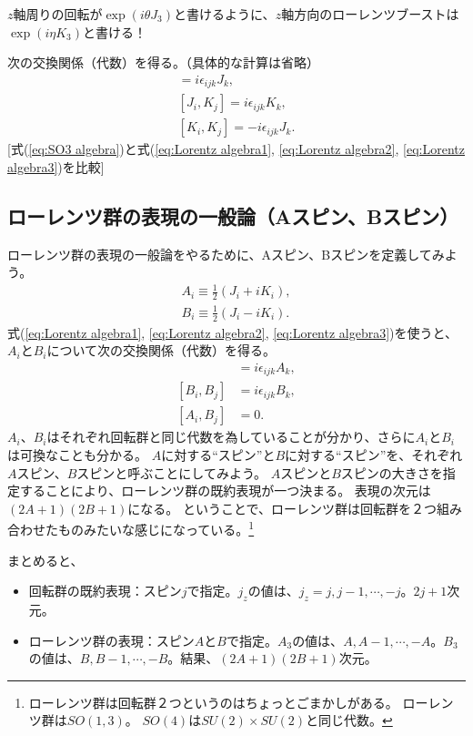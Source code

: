 \documentclass[10pt,a4paper]{jarticle}
\begin{document}
$z$軸周りの回転が$\exp(i \theta J_3 )$と書けるように、$z$軸方向のローレンツブーストは$\exp(i\eta K_3)$と書ける！

次の交換関係（代数）を得る。（具体的な計算は省略）
\begin{align}
[J_i, J_j] = i\epsilon_{ijk} J_k, \label{eq:Lorentz algebra1}\\
[J_i, K_j] = i\epsilon_{ijk} K_k, \label{eq:Lorentz algebra2}\\
[K_i, K_j] = -i\epsilon_{ijk} J_k. \label{eq:Lorentz algebra3}
\end{align}
[式(\ref{eq:SO3 algebra})と式(\ref{eq:Lorentz algebra1}, \ref{eq:Lorentz algebra2}, \ref{eq:Lorentz algebra3})を比較]


\subsection{ローレンツ群の表現の一般論（Aスピン、Bスピン）}
ローレンツ群の表現の一般論をやるために、Aスピン、Bスピンを定義してみよう。
\begin{align}
A_i \equiv \frac{1}{2}(J_i + i K_i), \\
B_i \equiv \frac{1}{2}(J_i - i K_i).
\end{align}
%
式(\ref{eq:Lorentz algebra1}, \ref{eq:Lorentz algebra2}, \ref{eq:Lorentz algebra3})を使うと、
$A_i$と$B_i$について次の交換関係（代数）を得る。
\begin{align}
[A_i, A_j] &= i\epsilon_{ijk} A_k, \\
[B_i, B_j] &= i\epsilon_{ijk} B_k, \\
[A_i, B_j] &= 0.
\end{align}
$A_i$、$B_i$はそれぞれ回転群と同じ代数を為していることが分かり、さらに$A_i$と$B_i$は可換なことも分かる。
$A$に対する``スピン''と$B$に対する``スピン''を、それぞれ$A$スピン、$B$スピンと呼ぶことにしてみよう。
$A$スピンと$B$スピンの大きさを指定することにより、ローレンツ群の既約表現が一つ決まる。
表現の次元は$(2A+1)(2B+1)$になる。
ということで、ローレンツ群は回転群を２つ組み合わせたものみたいな感じになっている。\footnote{
ローレンツ群は回転群２つというのはちょっとごまかしがある。
ローレンツ群は$SO(1,3)$。
$SO(4)$は$SU(2) \times SU(2)$と同じ代数。
}

まとめると、
\begin{itemize}
\item 回転群の既約表現：スピン$j$で指定。$j_z$の値は、$j_z = j, j-1, \cdots, -j$。$2j+1$次元。
\item ローレンツ群の表現：スピン$A$と$B$で指定。$A_3$の値は、$A, A-1, \cdots, -A$。$B_3$の値は、$B, B-1, \cdots, -B$。結果、$(2A+1)(2B+1)$次元。
\end{itemize}
\end{document}
